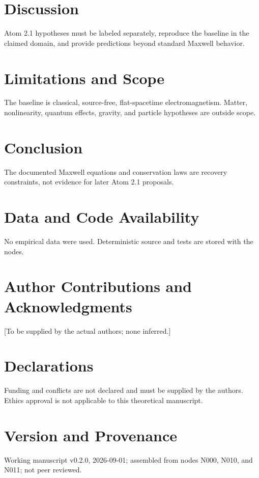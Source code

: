 \documentclass[11pt]{article}
\begin{document}
\section{Discussion}
Atom 2.1 hypotheses must be labeled separately, reproduce the baseline in the claimed
domain, and provide predictions beyond standard Maxwell behavior.

\section{Limitations and Scope}
The baseline is classical, source-free, flat-spacetime electromagnetism. Matter,
nonlinearity, quantum effects, gravity, and particle hypotheses are outside scope.

\section{Conclusion}
The documented Maxwell equations and conservation laws are recovery constraints, not
evidence for later Atom 2.1 proposals.

\section*{Data and Code Availability}
No empirical data were used. Deterministic source and tests are stored with the nodes.

\section*{Author Contributions and Acknowledgments}
[To be supplied by the actual authors; none inferred.]

\section*{Declarations}
Funding and conflicts are not declared and must be supplied by the authors. Ethics
approval is not applicable to this theoretical manuscript.

\section*{Version and Provenance}
Working manuscript v0.2.0, 2026-09-01; assembled from nodes N000, N010, and N011;
not peer reviewed.



\end{document}
